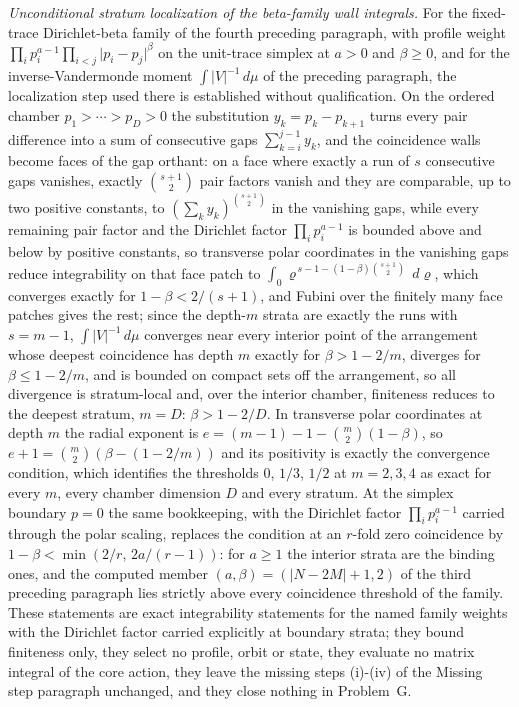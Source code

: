 \emph{Unconditional stratum localization of the beta-family wall integrals.} For the fixed-trace Dirichlet-beta family of the fourth preceding paragraph, with profile weight \(\prod_{i}p_{i}^{a-1}\prod_{i<j}\lvert p_{i}-p_{j}\rvert^{\beta}\) on the unit-trace simplex at \(a>0\) and \(\beta\ge0\), and for the inverse-Vandermonde moment \(\int\lvert V\rvert^{-1}\,d\mu\) of the preceding paragraph, the localization step used there is established without qualification. On the ordered chamber \(p_{1}>\cdots>p_{D}>0\) the substitution \(y_{k}=p_{k}-p_{k+1}\) turns every pair difference into a sum of consecutive gaps \(\sum_{k=i}^{j-1}y_{k}\), and the coincidence walls become faces of the gap orthant: on a face where exactly a run of \(s\) consecutive gaps vanishes, exactly \(\binom{s+1}{2}\) pair factors vanish and they are comparable, up to two positive constants, to \((\sum_{k}y_{k})^{\binom{s+1}{2}}\) in the vanishing gaps, while every remaining pair factor and the Dirichlet factor \(\prod_{i}p_{i}^{a-1}\) is bounded above and below by positive constants, so transverse polar coordinates in the vanishing gaps reduce integrability on that face patch to \(\int_{0}\varrho^{\,s-1-(1-\beta)\binom{s+1}{2}}\,d\varrho\), which converges exactly for \(1-\beta<2/(s+1)\), and Fubini over the finitely many face patches gives the rest; since the depth-\(m\) strata are exactly the runs with \(s=m-1\), \(\int\lvert V\rvert^{-1}\,d\mu\) converges near every interior point of the arrangement whose deepest coincidence has depth \(m\) exactly for \(\beta>1-2/m\), diverges for \(\beta\le1-2/m\), and is bounded on compact sets off the arrangement, so all divergence is stratum-local and, over the interior chamber, finiteness reduces to the deepest stratum, \(m=D\): \(\beta>1-2/D\). In transverse polar coordinates at depth \(m\) the radial exponent is \(e=(m-1)-1-\binom{m}{2}(1-\beta)\), so \(e+1=\binom{m}{2}(\beta-(1-2/m))\) and its positivity is exactly the convergence condition, which identifies the thresholds \(0\), \(1/3\), \(1/2\) at \(m=2,3,4\) as exact for every \(m\), every chamber dimension \(D\) and every stratum. At the simplex boundary \(p=0\) the same bookkeeping, with the Dirichlet factor \(\prod_{i}p_{i}^{a-1}\) carried through the polar scaling, replaces the condition at an \(r\)-fold zero coincidence by \(1-\beta<\min(2/r,\,2a/(r-1))\): for \(a\ge1\) the interior strata are the binding ones, and the computed member \((a,\beta)=(\lvert N-2M\rvert+1,2)\) of the third preceding paragraph lies strictly above every coincidence threshold of the family. These statements are exact integrability statements for the named family weights with the Dirichlet factor carried explicitly at boundary strata; they bound finiteness only, they select no profile, orbit or state, they evaluate no matrix integral of the core action, they leave the missing steps (i)-(iv) of the Missing step paragraph unchanged, and they close nothing in Problem~G.
